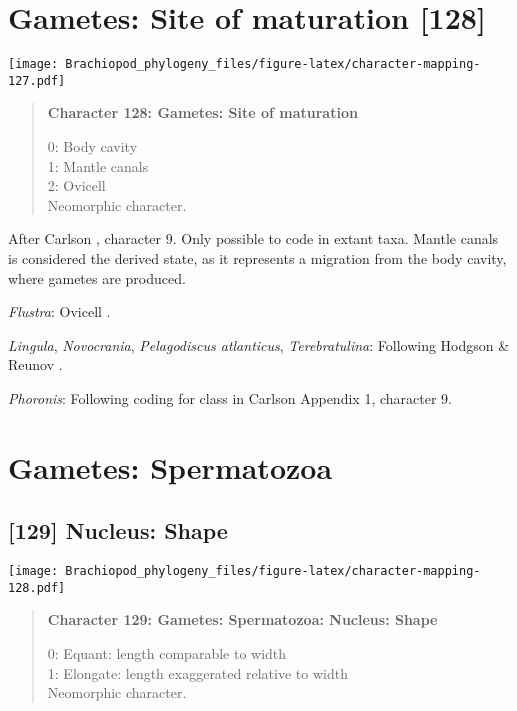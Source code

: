 \documentclass[openany]{book}
\theoremstyle{definition}
\theoremstyle{definition}
\theoremstyle{definition}
\theoremstyle{remark}
\begin{document}
\section{Gametes: Site of maturation
{[}128{]}}\label{gametes-site-of-maturation-128}

\texttt{[image: Brachiopod\_phylogeny\_files/figure-latex/character-mapping-127.pdf]}

\begin{quote}
\textbf{Character 128: Gametes: Site of maturation}

0: Body cavity\\
1: Mantle canals\\
2: Ovicell\\
Neomorphic character.
\end{quote}

After Carlson \citeyearpar{Carlson1995Phylogeneticrelationships},
character 9. Only possible to code in extant taxa. Mantle canals is
considered the derived state, as it represents a migration from the body
cavity, where gametes are produced.

\hypertarget{Flustra-coding-128}{}
\emph{Flustra}: Ovicell \citep{Franzen2013}.

\hypertarget{Lingula-coding-128}{}
\emph{Lingula}, \emph{Novocrania}, \emph{Pelagodiscus atlanticus},
\emph{Terebratulina}: Following Hodgson \& Reunov
\citeyearpar{Hodgson1994Ultrastructureof}.

\hypertarget{Phoronis-coding-128}{}
\emph{Phoronis}: Following coding for class in Carlson
\citeyearpar{Carlson1995Phylogeneticrelationships} Appendix 1, character
9.

\section{Gametes: Spermatozoa}\label{gametes-spermatozoa}

\subsection*{{[}129{]} Nucleus: Shape}\label{nucleus-shape}

\texttt{[image: Brachiopod\_phylogeny\_files/figure-latex/character-mapping-128.pdf]}

\begin{quote}
\textbf{Character 129: Gametes: Spermatozoa: Nucleus: Shape}

0: Equant: length comparable to width\\
1: Elongate: length exaggerated relative to width\\
Neomorphic character.
\end{quote}
\end{document}
